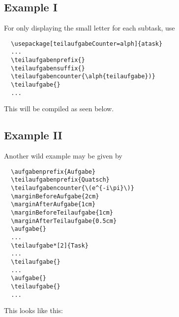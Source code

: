 \documentclass{ctext}
\begin{document}
\subsection{Example I}
For only displaying the small letter for each subtask, use
\begin{verbatim}
  \usepackage[teilaufgabeCounter=alph]{atask}
  ...
  \teilaufgabenprefix{}
  \teilaufgabensuffix{}
  \teilaufgabencounter{\alph{teilaufgabe})}
  \teilaufgabe{}
  ...
\end{verbatim}
This will be compiled as seen below.
\teilaufgabenprefix{}
\teilaufgabensuffix{}
\aufgabe{}
\teilaufgabe{}
\lipsum[1]



\subsection{Example II}
Another wild example may be given by
\begin{verbatim}
  \aufgabenprefix{Aufgabe}
  \teilaufgabenprefix{Quatsch}
  \teilaufgabencounter{\(e^{-i\pi}\)}
  \marginBeforeAufgabe{2cm}
  \marginAfterAufgabe{1cm}
  \marginBeforeTeilaufgabe{1cm}
  \marginAfterTeilaufgabe{0.5cm}
  \aufgabe{}
  ...
  \teilaufgabe*[2]{Task}
  ...
  \teilaufgabe{}
  ...
  \aufgabe{}
  \teilaufgabe{}
  ...
\end{verbatim}
This looks like this:
\marginBeforeAufgabe{2cm}
\marginAfterAufgabe{1cm}
\marginBeforeTeilaufgabe{1cm}
\marginAfterTeilaufgabe{0.5cm}
\aufgabe{}
\lipsum[1]
\lipsum[1]
\teilaufgabe{}
\lipsum[1]
\aufgabe{}
\teilaufgabe{}
\lipsum[1-6]
\end{document}
